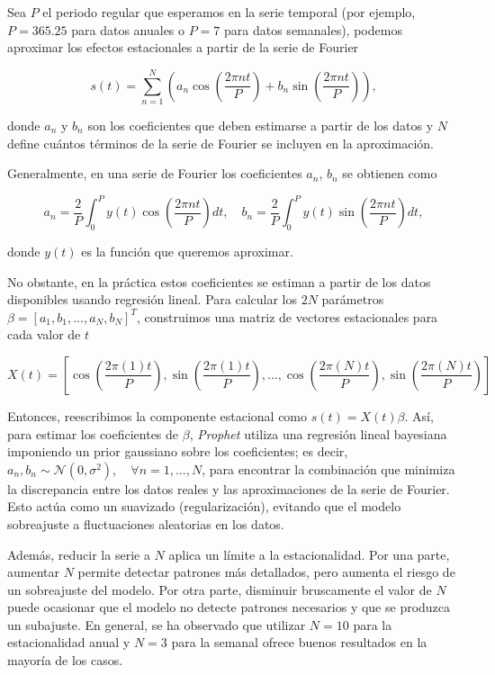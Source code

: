 \documentclass[12pt,twoside]{article}
\begin{document}
Sea $P$ el periodo regular que esperamos en la serie temporal (por ejemplo, $P=365.25$ para datos anuales o $P=7$ para datos semanales), podemos aproximar los efectos estacionales a partir de la serie de Fourier 

\begin{equation}
s(t) = \sum_{n=1}^{N} \left( a_n \cos \left(\frac{2\pi n t}{P}\right) + b_n \sin \left( \frac{2\pi n t}{P}\right) \right),
\end{equation}

donde $a_n$ y $b_n$ son los coeficientes que deben estimarse a partir de los datos y $N$ define cuántos términos de la serie de Fourier se incluyen en la aproximación.

Generalmente, en una serie de Fourier los coeficientes $a_n$, $b_n$ se obtienen como

\begin{equation}
a_n = \frac{2}{P} \int_{0}^{P} y(t) \cos \left( \frac{2\pi n t}{P} \right) dt, \quad 
b_n = \frac{2}{P} \int_{0}^{P} y(t) \sin \left( \frac{2\pi n t}{P} \right) dt,
\end{equation}

donde $y(t)$ es la función que queremos aproximar.

No obstante, en la práctica estos coeficientes se estiman a partir de los datos disponibles usando regresión lineal. Para calcular los $2N$ parámetros $\beta = [ a_1, b_1, ..., a_N, b_N]^T$, construimos una matriz de vectores estacionales para cada valor de $t$ 

\begin{equation}
X(t) = \left[\cos \left(\frac{2\pi (1) t}{P}\right), \sin \left(\frac{2\pi (1) t}{P}\right), ..., \cos \left(\frac{2\pi (N) t}{P}\right), \sin \left(\frac{2\pi (N) t}{P}\right) \right]
\end{equation}

Entonces, reescribimos la componente estacional como $s(t) = X(t)\beta$. Así, para estimar los coeficientes de $\beta$, \textit{Prophet} utiliza una regresión lineal bayesiana imponiendo un prior gaussiano sobre los coeficientes; es decir, $a_n, b_n \sim \mathcal{N}(0, \sigma^2), \quad \forall n = 1, \dots, N$, para encontrar la combinación que minimiza la discrepancia entre los datos reales y las aproximaciones de la serie de Fourier. Esto actúa como un suavizado (regularización), evitando que el modelo sobreajuste a fluctuaciones aleatorias en los datos.

Además, reducir la serie a $N$ aplica un límite a la estacionalidad. Por una parte, aumentar $N$ permite detectar patrones más detallados, pero aumenta el riesgo de un sobreajuste del modelo. Por otra parte, disminuir bruscamente el valor de $N$ puede ocasionar que el modelo no detecte patrones necesarios y que se produzca un subajuste.
En general, se ha observado que utilizar $N = 10$ para la estacionalidad anual y $N = 3$ para la semanal ofrece buenos resultados en la mayoría de los casos.
\end{document}
